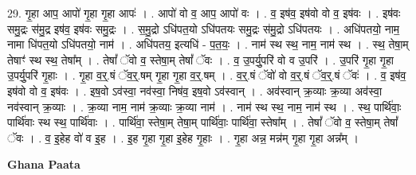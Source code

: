 \documentclass[17pt]{extarticle}
\begin{document}
29. गृ॒हा आप॒ आपो॑ गृ॒हा गृ॒हा आपः॑ । . आपो॑ वो व॒ आप॒ आपो॑ वः । . व॒ इष॑व॒ इष॑वो वो व॒ इष॑वः । . इष॑वः समु॒द्रः स॑मु॒द्र इष॑व॒ इष॑वः समु॒द्रः । . स॒मु॒द्रो ऽधि॑पत॒यो ऽधि॑पतयः समु॒द्रः स॑मु॒द्रो ऽधि॑पतयः । . अधि॑पतयो॒ नाम॒ नामा धि॑पत॒यो ऽधि॑पतयो॒ नाम॑ । . अधि॑पतय॒ इत्यधि॑ - प॒त॒यः॒ । . नाम॑ स्थ स्थ॒ नाम॒ नाम॑ स्थ । . स्थ॒ तेषा॒म् तेषाꣳ॑ स्थ स्थ॒ तेषा᳚म् । . तेषां᳚ ॅवो व॒ स्तेषा॒म् तेषां᳚ ॅवः । . व॒ उ॒पर्यु॒परि॑ वो व उ॒परि॑ । . उ॒परि॑ गृ॒हा गृ॒हा उ॒पर्यु॒परि॑ गृ॒हाः । . गृ॒हा व॒र्॒.षं ॅव॒र्॒.षम् गृ॒हा गृ॒हा व॒र्॒.षम् । . व॒र्॒.षं ॅवो॑ वो व॒र्॒.षं ॅव॒र्॒.षं ॅवः॑ । . व॒ इष॑व॒ इष॑वो वो व॒ इष॑वः । . इष॒वो ऽव॑स्वा॒ नव॑स्वा॒ निष॑व॒ इष॒वो ऽव॑स्वान् । . अव॑स्वान् क्र॒व्याः क्र॒व्या अव॑स्वा॒ नव॑स्वान् क्र॒व्याः । . क्र॒व्या नाम॒ नाम॑ क्र॒व्याः क्र॒व्या नाम॑ । . नाम॑ स्थ स्थ॒ नाम॒ नाम॑ स्थ । . स्थ॒ पार्थि॑वाः॒ पार्थि॑वाः स्थ स्थ॒ पार्थि॑वाः । . पार्थि॑वा॒ स्तेषा॒म् तेषा॒म् पार्थि॑वाः॒ पार्थि॑वा॒ स्तेषा᳚म् । . तेषां᳚ ॅवो व॒ स्तेषा॒म् तेषां᳚ ॅवः । . व॒ इ॒हेह वो॑ व इ॒ह । . इ॒ह गृ॒हा गृ॒हा इ॒हेह गृ॒हाः । . गृ॒हा अन्न॒ मन्न॑म् गृ॒हा गृ॒हा अन्न᳚म् । \newline

\textbf{Ghana Paata } \newline
\end{document}
